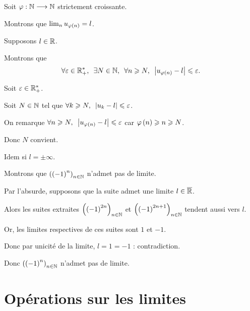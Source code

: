 \begin{dem}
Soit \(\varphi:\mathbb{N}\longrightarrow\mathbb{N}\) strictement croissante.

Montrons que \(\lim_nu_{\varphi\left(n\right)}=l\).

Supposons \(l\in\mathbb{R}\).

Montrons que \[\quantifs{\forall\epsilon\in\Rps;\exists N\in\N;\forall n\geq N}\abs{u_{\phi\paren{n}}-l}\leq\epsilon.\]

Soit \(\varepsilon\in\mathbb{R}_+^*\).

Soit \(N\in\mathbb{N}\) tel que \(\quantifs{\forall k\geq N}\abs{u_k-l}\leq\epsilon\).

On remarque \(\quantifs{\forall n\geq N}\abs{u_{\phi\paren{n}}-l}\leq\epsilon\) car \(\varphi\left(n\right)\geqslant n\geqslant N\).

Donc \(N\) convient.

Idem si \(l=\pm\infty\).
\end{dem}

\begin{ex}
Montrons que \(\left(\left(-1\right)^n\right)_{n\in\mathbb{N}}\) n'admet pas de limite.

Par l'absurde, supposons que la suite admet une limite \(l\in\overline{\mathbb{R}}\).

Alors les suites extraites \(\left(\left(-1\right)^{2n}\right)_{n\in\mathbb{N}}\) et \(\left(\left(-1\right)^{2n+1}\right)_{n\in\mathbb{N}}\) tendent aussi vers \(l\).

Or, les limites respectives de ces suites sont \(1\) et \(-1\).

Donc par unicité de la limite, \(l=1=-1\) : contradiction.

Donc \(\left(\left(-1\right)^n\right)_{n\in\mathbb{N}}\) n'admet pas de limite.
\end{ex}

\section{Opérations sur les limites}

